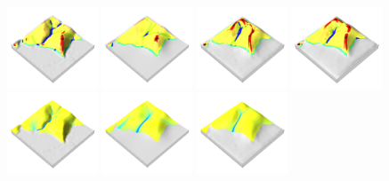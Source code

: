 \documentclass[prodmode,acmtochi]{acmsmall} %
\begin{document}
\begin{figure}[h!]
\begin{center}
		\includegraphics[width=0.24\textwidth]{images/render_3d/forms_1.png}
		\includegraphics[width=0.24\textwidth]{images/render_3d/mean_forms_1.png}
		\includegraphics[width=0.24\textwidth]{images/render_3d/mean_forms_2.png}
		\includegraphics[width=0.24\textwidth]{images/render_3d/mean_forms_3.png}
		\includegraphics[width=0.24\textwidth]{images/render_3d/depth_1.png}
		\includegraphics[width=0.24\textwidth]{images/render_3d/mean_depth_1.png}
		\includegraphics[width=0.24\textwidth]{images/render_3d/mean_depth_2.png}

\end{center}
\end{figure}
\end{document}
